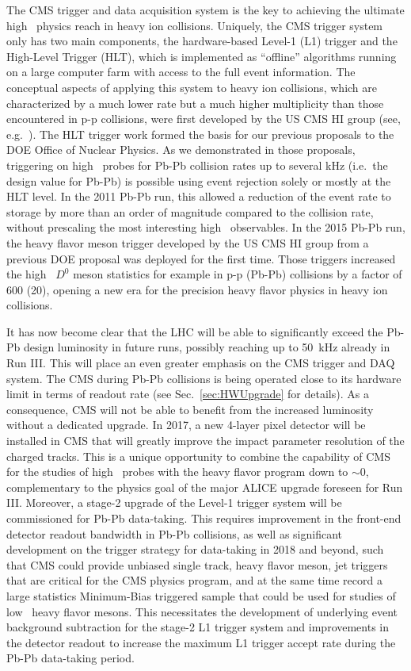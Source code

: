 The CMS trigger and data acquisition system is the key to achieving the ultimate high \pt\ physics reach in heavy ion collisions. Uniquely, the CMS trigger system only has two main components, the hardware-based Level-1 (L1) trigger and the High-Level Trigger (HLT), which is implemented as ``offline'' algorithms running on a large computer farm with access to the full event information.  
The conceptual aspects of applying this system to heavy ion collisions, which are characterized by a much lower rate but a much higher multiplicity than those encountered in p-p collisions, were first developed by the US CMS HI group (see, e.g.\ \cite{Roland:2007is}). The HLT trigger work formed the basis for our previous proposals to the DOE Office of Nuclear Physics. As we demonstrated in those proposals, triggering on high \pt\ probes for Pb-Pb collision rates up to several kHz (i.e.\ the design value for Pb-Pb) is possible using event rejection solely or mostly at the HLT level. In the 2011 Pb-Pb run, this allowed a reduction of the event rate to storage by more than an order of magnitude compared to the collision rate, without prescaling the most interesting high \pt\ observables. In the 2015 Pb-Pb run, the heavy flavor meson trigger developed by the US CMS HI group from a previous DOE proposal was deployed for the first time. Those triggers increased the high \pt\ $D^0$ meson statistics for example in p-p (Pb-Pb) collisions by a factor of 600 (20), opening a new era for the precision heavy flavor physics in heavy ion collisions.

It has now become clear that the LHC will be able to significantly exceed the Pb-Pb design luminosity in future runs, possibly reaching up to 50~kHz already in Run III. This will place an even greater emphasis on the CMS trigger and DAQ system. The CMS during Pb-Pb collisions is being operated close to its hardware limit in terms of readout rate (see Sec.~\ref{sec:HWUpgrade} for details). As a consequence, CMS will not be able to benefit from the increased luminosity without a dedicated upgrade. 
In 2017, a new 4-layer pixel detector will be installed in CMS that will greatly improve the impact parameter resolution of the charged tracks. This is a unique opportunity to combine the capability of CMS for the studies of high \pt\ probes with the heavy flavor program down to \pt$\sim 0$, complementary to the physics goal of the major ALICE upgrade foreseen for Run III. Moreover, a stage-2 upgrade of the Level-1 trigger system will be commissioned for Pb-Pb data-taking. This requires improvement in the front-end detector readout bandwidth in Pb-Pb collisions, as well as significant development on the trigger strategy for data-taking in 2018 and beyond, such that CMS could provide unbiased single track, heavy flavor meson, jet triggers that are critical for the CMS physics program, and at the same time record a large statistics Minimum-Bias triggered sample that could be used for studies of low \pt\ heavy flavor mesons. This necessitates the development of underlying event background subtraction for the stage-2 L1 trigger system and improvements in the detector readout to increase the maximum L1 trigger accept rate during the Pb-Pb data-taking period.


